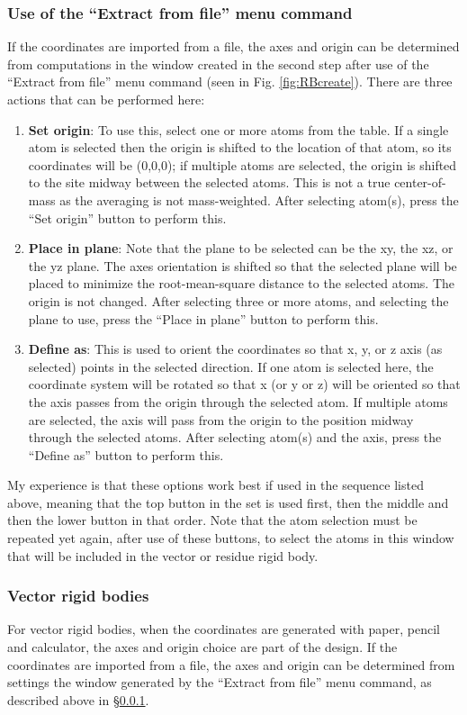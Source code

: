 \subsubsection{Use of the ``Extract from file'' menu command}\label{ref:resRBaxes}
If the coordinates are imported from a file, the axes and origin can be determined from computations in the window created in the second step after use of the ``Extract from file'' menu command (seen in Fig. \ref{fig:RBcreate}). There are three actions that can be performed here: 
\begin{enumerate}
    \item \textbf{Set origin}: To use this, select one or more atoms from the table. If a single atom is selected then the origin is shifted to the location of that atom, so its coordinates will be (0,0,0); if multiple atoms are selected, the origin is shifted to the site midway between the selected atoms. This is not a true center-of-mass as the averaging is not mass-weighted. After selecting atom(s), press the ``Set origin'' button to perform this. 
    \item  \textbf{Place in plane}: Note that the plane to be selected can be the xy, the xz, or the yz plane. The axes orientation is shifted so that the selected plane will be placed to minimize the root-mean-square distance to the selected atoms. The origin is not changed. After selecting three or more atoms, and selecting the plane to use, press the ``Place in plane'' button to perform this. 
    \item \textbf{Define as}: This is used to orient the coordinates so that x, y, or z axis (as selected) points in the selected direction. If one atom is selected here, the coordinate system will be rotated so that x (or y or z) will be oriented so that the axis passes from the origin through the selected atom. If multiple atoms are selected, the axis will pass from the origin to the position midway through the selected atoms. After selecting atom(s) and the axis, press the ``Define as'' button to perform this. 
\end{enumerate}
My experience is that these options work best if used in the sequence listed above, meaning that the top button in the set is used first, then the middle and then the lower button in that order. Note that the atom selection must be repeated yet again, after use of these buttons, to select the atoms in this window that will be included in the vector or residue rigid body. 
\subsubsection{Vector rigid bodies}
For vector rigid bodies, when the coordinates are generated with paper, pencil and calculator, the axes and origin choice are part of the design. If the coordinates are imported from a file, the axes and origin can be determined from settings the window generated by the ``Extract from file'' menu command, as described above in \S\ref{ref:resRBaxes}.
